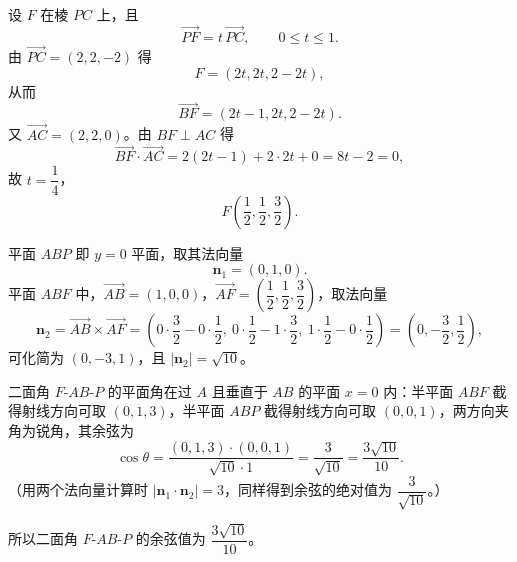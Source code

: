 \begin{answer}

设 $F$ 在棱 $PC$ 上，且
\nopagebreak[4]
\[\overrightarrow{PF}=t\,\overrightarrow{PC},\qquad 0\leqslant t\leqslant1.\]
由 $\overrightarrow{PC}=(2,2,-2)$ 得
\nopagebreak[4]
\[F=(2t,2t,2-2t),\]
从而
\nopagebreak[4]
\[\overrightarrow{BF}=(2t-1,2t,2-2t).\]
又 $\overrightarrow{AC}=(2,2,0)$。由 $BF\perp AC$ 得
\nopagebreak[4]
\[\overrightarrow{BF}\cdot\overrightarrow{AC}=2(2t-1)+2\cdot2t+0=8t-2=0,\]
故 $t=\dfrac14$，
\nopagebreak[4]
\[F\left(\frac12,\frac12,\frac32\right).\]

平面 $ABP$ 即 $y=0$ 平面，取其法向量
\nopagebreak[4]
\[\boldsymbol n_1=(0,1,0).\]
平面 $ABF$ 中，$\overrightarrow{AB}=(1,0,0)$，$\overrightarrow{AF}=\left(\dfrac12,\dfrac12,\dfrac32\right)$，取法向量
\nopagebreak[4]
\[\boldsymbol n_2=\overrightarrow{AB}\times\overrightarrow{AF}
=\left(0\cdot\frac32-0\cdot\frac12,\ 0\cdot\frac12-1\cdot\frac32,\ 1\cdot\frac12-0\cdot\frac12\right)
=\left(0,-\frac32,\frac12\right),\]
可化简为 $(0,-3,1)$，且 $|\boldsymbol n_2|=\sqrt{10}$。

二面角 $F\text{-}AB\text{-}P$ 的平面角在过 $A$ 且垂直于 $AB$ 的平面 $x=0$ 内：半平面 $ABF$ 截得射线方向可取 $(0,1,3)$，半平面 $ABP$ 截得射线方向可取 $(0,0,1)$，两方向夹角为锐角，其余弦为
\nopagebreak[4]
\[\cos\theta=\frac{(0,1,3)\cdot(0,0,1)}{\sqrt{10}\cdot1}=\frac{3}{\sqrt{10}}=\frac{3\sqrt{10}}{10}.\]
（用两个法向量计算时 $|\boldsymbol n_1\cdot\boldsymbol n_2|=3$，同样得到余弦的绝对值为 $\dfrac{3}{\sqrt{10}}$。）

所以二面角 $F\text{-}AB\text{-}P$ 的余弦值为 $\dfrac{3\sqrt{10}}{10}$。




\end{answer}
